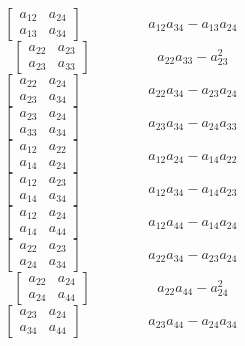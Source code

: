 $$\left[\begin{matrix}a_{12} & a_{24}\\a_{13} & a_{34}\end{matrix}\right]\hspace{2cm} a_{12} a_{34} - a_{13} a_{24}$$   
$$\left[\begin{matrix}a_{22} & a_{23}\\a_{23} & a_{33}\end{matrix}\right]\hspace{2cm} a_{22} a_{33} - a_{23}^{2}$$   
$$\left[\begin{matrix}a_{22} & a_{24}\\a_{23} & a_{34}\end{matrix}\right]\hspace{2cm} a_{22} a_{34} - a_{23} a_{24}$$   
$$\left[\begin{matrix}a_{23} & a_{24}\\a_{33} & a_{34}\end{matrix}\right]\hspace{2cm} a_{23} a_{34} - a_{24} a_{33}$$   
$$\left[\begin{matrix}a_{12} & a_{22}\\a_{14} & a_{24}\end{matrix}\right]\hspace{2cm} a_{12} a_{24} - a_{14} a_{22}$$   
$$\left[\begin{matrix}a_{12} & a_{23}\\a_{14} & a_{34}\end{matrix}\right]\hspace{2cm} a_{12} a_{34} - a_{14} a_{23}$$   
$$\left[\begin{matrix}a_{12} & a_{24}\\a_{14} & a_{44}\end{matrix}\right]\hspace{2cm} a_{12} a_{44} - a_{14} a_{24}$$   
$$\left[\begin{matrix}a_{22} & a_{23}\\a_{24} & a_{34}\end{matrix}\right]\hspace{2cm} a_{22} a_{34} - a_{23} a_{24}$$   
$$\left[\begin{matrix}a_{22} & a_{24}\\a_{24} & a_{44}\end{matrix}\right]\hspace{2cm} a_{22} a_{44} - a_{24}^{2}$$   
$$\left[\begin{matrix}a_{23} & a_{24}\\a_{34} & a_{44}\end{matrix}\right]\hspace{2cm} a_{23} a_{44} - a_{24} a_{34}$$   
